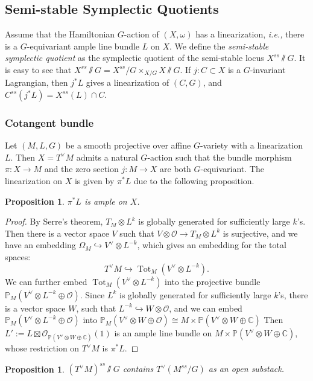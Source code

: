 \documentclass[12pt]{amsart}
\newtheorem{proposition}[theorem]{Proposition}
\theoremstyle{definition}
\theoremstyle{remark}
\numberwithin{equation}{section}
\newcommand{\CC}{\mathbb{C}}
\newcommand{\PP}{\mathbb{P}}
\newcommand{\shO}{\mathcal{O}}
\newcommand{\Tot}{\operatorname{Tot}}
\newcommand{\arw}{\longrightarrow}
\begin{document}
\subsection{Semi-stable Symplectic Quotients}
Assume that the Hamiltonian $G$-action of $(X, \omega)$ has a linearization, \emph{i.e.,} there is a $G$-equivariant ample line bundle $L$ on $X$. We define the \emph{semi-stable symplectic quotient} as the symplectic quotient of the semi-stable locus $X^{ss}\sslash  G$. It is easy to see that $X^{ss}\sslash  G=X^{ss}/G\times_{X/G} X\sslash  G$.
If $j: C\subset X$ is a $G$-invariant Lagrangian, then $j^{*}L$ gives a linearization of $(C, G)$, and $C^{ss}(j^{*}L)=X^{ss}(L)\cap C$.
\subsubsection{Cotangent bundle}
  Let $(M, L, G)$ be a smooth projective over affine $G$-variety with a linearization $L$. Then $X=T^{\vee}M$ admits a natural $G$-action such that the bundle morphism $\pi: X\arw M$ and the zero section $j: M\arw X$ are both $G$-equivariant. The linearization on $X$ is given by $\pi^{*}L$ due to the following proposition. 
\begin{proposition}
    $\pi^{*}L$ is ample on $X$.
\end{proposition}
  \begin{proof}
      By Serre's theorem, $T_M\otimes L^k$ is globally generated for sufficiently large $k$'s. Then there is a vector space $V$ such that $V\otimes\shO\arw T_M\otimes L^k$ is surjective, and we have an embedding $\Omega_M\hookrightarrow V^{\vee}\otimes L^{-k}$, which gives an embedding for the total spaces:
      $$T^{\vee}M\hookrightarrow \Tot_M(V^{\vee}\otimes L^{-k}).$$
      We can further embed $\Tot_M(V^{\vee}\otimes L^{-k})$ into the projective bundle 
      $\PP_M(V^{\vee}\otimes L^{-k}\oplus \shO).$
      Since $L^k$ is globally generated for sufficiently large $k$'s, there is a vector space $W$, such that $L^{-k}\hookrightarrow W\otimes \shO$, and we can embed $\PP_M(V^{\vee}\otimes L^{-k}\oplus \shO)$ into $\PP_M(V^{\vee}\otimes W\oplus \shO)\cong M\times \PP(V^{\vee}\otimes W\oplus\CC)$
       Then $L':=L\boxtimes \shO_{\PP(V^{\vee}\otimes W\oplus\CC)}(1)$ is an ample line bundle on $M\times \PP(V^{\vee}\otimes W\oplus\CC)$, whose restriction on $T^{\vee}M$ is $\pi^*L$. 
  \end{proof}
  \begin{proposition} 
      $(T^{\vee}M)^{ss}\sslash  G$ contains $T^{\vee}({M^{ss}/G})$ as an open substack. 
  \end{proposition}
\end{document}
